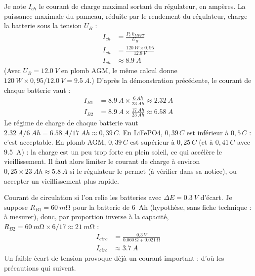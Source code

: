 \begin{demonstration}
Je note $I_{ch}$ le courant de charge maximal sortant du régulateur, en ampères. La puissance maximale du panneau, réduite par le rendement du régulateur, charge la batterie sous la tension $U_B$ :
\begin{align*}
I_{ch} &= \frac{P_c\, k_{MPPT}}{U_B}\\
I_{ch} &= \frac{\qty{120}{W} \times 0{,}95}{\qty{12,8}{V}}\\
I_{ch} &\approx \qty{8,9}{A}
\end{align*}
(Avec $U_B = \qty{12,0}{V}$ en plomb AGM, le même calcul donne $\qty{120}{W} \times 0{,}95/\qty{12,0}{V} = \qty{9,5}{A}$.) D'après la démonstration précédente, le courant de chaque batterie vaut :
\begin{align*}
I_{B1} &= \qty{8,9}{A} \times \frac{\qty{6}{Ah}}{\qty{23}{Ah}} \approx \qty{2,32}{A}\\
I_{B2} &= \qty{8,9}{A} \times \frac{\qty{17}{Ah}}{\qty{23}{Ah}} \approx \qty{6,58}{A}
\end{align*}
Le régime de charge de chaque batterie vaut $\qty{2,32}{A}/\qty{6}{Ah} = \qty{6,58}{A}/\qty{17}{Ah} \approx 0{,}39\,C$. En LiFePO4, $0{,}39\,C$ est inférieur à $0{,}5\,C$ : c'est acceptable. En plomb AGM, $0{,}39\,C$ est supérieur à $0{,}25\,C$ (et à $0{,}41\,C$ avec \qty{9,5}{A}) : la charge est un peu trop forte en plein soleil, ce qui accélère le vieillissement. Il faut alors limiter le courant de charge à environ $0{,}25 \times \qty{23}{Ah} \approx \qty{5,8}{A}$ si le régulateur le permet (à vérifier dans sa notice), ou accepter un vieillissement plus rapide.

Courant de circulation si l'on relie les batteries avec $\Delta E = \qty{0,3}{V}$ d'écart. Je suppose $R_{B1} = \qty{60}{m\ohm}$ pour la batterie de \qty{6}{Ah} (hypothèse, sans fiche technique : à mesurer), donc, par proportion inverse à la capacité, $R_{B2} = \qty{60}{m\ohm} \times 6/17 \approx \qty{21}{m\ohm}$ :
\begin{align*}
I_{circ} &= \frac{\qty{0,3}{V}}{\qty{0,060}{\ohm} + \qty{0,021}{\ohm}}\\
I_{circ} &\approx \qty{3,7}{A}
\end{align*}
Un faible écart de tension provoque déjà un courant important : d'où les précautions qui suivent.
\end{demonstration}

